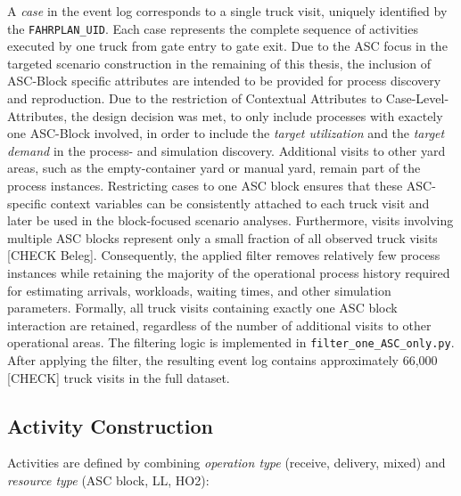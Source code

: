     A \textit{case} in the event log corresponds to a single truck visit, uniquely identified by the \texttt{FAHRPLAN\_UID}. Each case represents the complete sequence of activities executed by one truck from gate entry to gate exit. Due to the ASC focus in the targeted scenario construction in the remaining of this thesis, the inclusion of ASC-Block specific attributes are intended to be provided for process discovery and reproduction. Due to the restriction of Contextual Attributes to Case-Level-Attributes, the design decision was met, to only include processes with exactely one ASC-Block involved, in order to include the \textit{target utilization} and the \textit{target demand} in the process- and simulation discovery. Additional visits to other yard areas, such as the empty-container yard or manual yard, remain part of the process instances. Restricting cases to one ASC block ensures that these ASC-specific context variables can be consistently attached to each truck visit and later be used in the block-focused scenario analyses. Furthermore, visits involving multiple ASC blocks represent only a small fraction of all observed truck visits [CHECK Beleg]. Consequently, the applied filter removes relatively few process instances while retaining the majority of the operational process history required for estimating arrivals, workloads, waiting times, and other simulation parameters. Formally, all truck visits containing exactly one ASC block interaction are retained, regardless of the number of additional visits to other operational areas. The filtering logic is implemented in \texttt{filter\_one\_ASC\_only.py}. After applying the filter, the resulting event log contains approximately 66,000 [CHECK] truck visits in the full dataset.

    \subsection{Activity Construction}

    Activities are defined by combining \textit{operation type} (receive, delivery, mixed) and \textit{resource type} (ASC block, LL, HO2):
    
